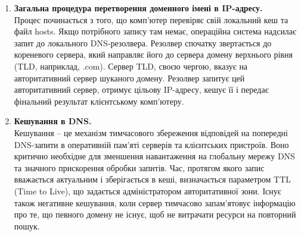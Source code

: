 \documentclass[14pt, a4paper]{extreport}
\begin{document}
\begin{enumerate}
		\item \textbf{Загальна процедура перетворення доменного імені в IP-адресу.} \\ Процес починається з того, що комп'ютер перевіряє свій локальний кеш та файл hosts. Якщо потрібного запису там немає, операційна система надсилає запит до локального DNS-резолвера. Резолвер спочатку звертається до кореневого сервера, який направляє його до сервера домену верхнього рівня (TLD, наприклад, .com). Сервер TLD, своєю чергою, вказує на авторитативний сервер шуканого домену. Резолвер запитує цей авторитативний сервер, отримує цільову IP-адресу, кешує її і передає фінальний результат клієнтському комп'ютеру.
		
		\item \textbf{Кешування в DNS.} \\ Кешування -- це механізм тимчасового збереження відповідей на попередні DNS-запити в оперативній пам'яті серверів та клієнтських пристроїв. Воно критично необхідне для зменшення навантаження на глобальну мережу DNS та значного прискорення обробки запитів. Час, протягом якого запис вважається актуальним і зберігається в кеші, визначається параметром TTL (Time to Live), що задається адміністратором авторитативної зони. Існує також негативне кешування, коли сервер тимчасово запам'ятовує інформацію про те, що певного домену не існує, щоб не витрачати ресурси на повторний пошук.
	\end{enumerate}
\end{document}
